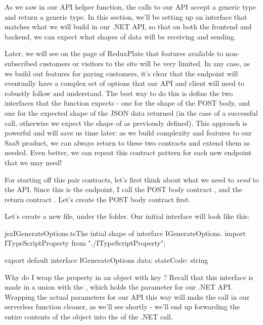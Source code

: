 \documentclass[paper=6in:9in,pagesize=pdftex,headinclude=on,footinclude=on,12pt,twoside]{scrbook}
\begin{document}
As we saw in our  API helper function, the calls to our API accept a generic type and return a generic type. In this section, we'll be setting up an interface that matches what we will build in our .NET API, so that on both the frontend and backend, we can expect what shapes of data will be receiving and sending. 

Later, we will see on the  page of ReduxPlate that features available to non-subscribed customers or visitors to the site will be very limited. In any case, as we build out features for paying customers, it's clear that the  endpoint will eventually have a complex set of options that our API and client will need to robustly follow and understand. The best way to do this is define the two interfaces that the  function expects - one for the shape of the POST body, and one for the expected shape of the JSON data returned (in the case of a successful call, otherwise we expect the shape of  as previously defined). This approach is powerful and will save us time later: as we build complexity and features to our SaaS product, we can always return to these two contracts and extend them as needed. Even better, we can repeat this contract pattern for each new endpoint that we may need!

For starting off this pair contracts, let's first think about what we need to \textit{send} to the API. Since this is the  endpoint, I call the POST body contract , and the return contract . Let's create the POST body contract first.


Let's create a new file,  under the  folder. Our initial  interface will look like this:

\begin{codeInput}{jsx}{IGenerateOptions.ts}{The intial shape of interface IGenerateOptions.}
import ITypeScriptProperty from "./ITypeScriptProperty";

export default interface IGenerateOptions {
  data: {
    stateCode: string
  }
}
\end{codeInput}

Why do I wrap the  property in an object with key ? Recall that this interface is made in a union with the , which holds the  parameter for our .NET API. Wrapping the actual parameters for our API this way will make the call in our serverless function cleaner, as we'll see shortly - we'll end up forwarding the entire contents of the  object into the  of the .NET call.
\end{document}
